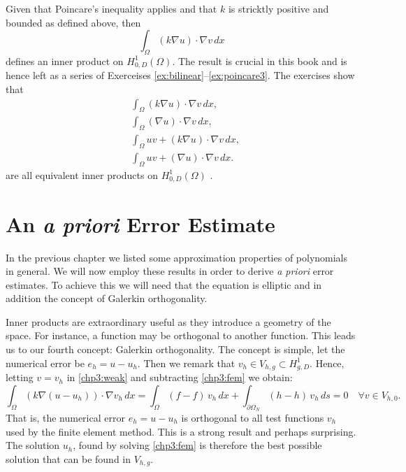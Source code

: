 Given that Poincare's inequality applies and that $k$ is stricktly positive and bounded as defined above, then 
\[
\int_\Omega (k \nabla u) \cdot \nabla v \, dx 
\]
defines an inner product
on $H^1_{0, D} (\Omega)$. 
The result is crucial in this book and is hence left as a series of Exerceises \ref{ex:bilinear}--\ref{ex:poincare3}.  
The exercises show that
\begin{align}
	&\int_\Omega (k \nabla u) \cdot \nabla v \, dx,  \\  
	&\int_\Omega (\nabla u) \cdot \nabla v \, dx,  \\ 
	&\int_\Omega u v + (k \nabla u) \cdot \nabla v \, dx,  \\ 
	&\int_\Omega u v + ( \nabla u) \cdot \nabla v \, dx .  
\end{align}
are all equivalent inner products on $H^1_{0, D}(\Omega)$ . 

\section{An \emph{a priori} Error Estimate}

In the previous chapter we listed some approximation properties of polynomials in general. We will now employ these results in order to
derive \emph{a priori} error estimates. To achieve this we will need that the equation is elliptic and in addition 
the concept of Galerkin orthogonality. 


Inner products are extraordinary useful as they introduce a geometry of the space. For instance, 
a function may be orthogonal to another function. This leads us to our fourth concept: 
Galerkin orthogonality. The concept is simple, let the numerical error be $e_h = u - u_h$. Then we
remark that $v_h \in V_{h,g} \subset H^1_{g, D}$. Hence, letting 
$v=v_h$ in \eqref{chp3:weak} and subtracting \eqref{chp3:fem} we obtain:   
\begin{equation}
\label{chp3:orth}
	\int_\Omega (k \nabla (u -  u_h)) \cdot \nabla v_h \, dx = \int_\Omega (f -f) \, v_h \, dx + \int_{\partial \Omega_N} (h -h)  \, v_h \, ds = 0 \quad    \forall v\in  V_{h, 0} .  
\end{equation}
That is, the numerical error $e_h = u - u_h$ is orthogonal to all test functions $v_h$ used by the finite element method. This is a strong result and
perhaps surprising. The solution $u_h$, found by solving \eqref{chp3:fem} is therefore the best possible solution that can be found in $V_{h, g}$.   

